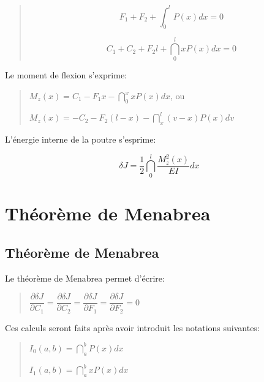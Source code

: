 \begin{quotation}
\begin{equation}
   \label{staticF}
   F_1+F_2+\int_0^l P(x)dx=0 
\end{equation}

\begin{equation}
   \label{staticC}
   C_1+C_2+F_2l+\dint_0^l x P(x)dx=0 
\end{equation}
\end{quotation}


\medskip
Le moment de flexion s'exprime:

\begin{quotation}
$M_z(x)=C_1-F_1x-\dint_0^x x P(x)dx$, ou

$M_z(x)=-C_2-F_2(l-x)-\dint_x^l(v-x) P(x)dv$
\end{quotation}

\medskip
L'énergie interne de la poutre s'esprime:

\[
\delta J=\frac 12\dint_0^l\dfrac{M_z^2(x)}{EI}dx
\]

\medskip
\ifVersionAvecExemplesSepares
   \section{Théorème de Menabrea}
\else
   \subsection{Théorème de Menabrea}
\fi

Le théorème de Menabrea permet d'écrire:

\begin{quotation}
   $\dfrac{\partial \delta J}{\partial C_1} =
    \dfrac{\partial \delta J}{\partial C_2} =
    \dfrac{\partial \delta J}{\partial F_1} =
    \dfrac{\partial \delta J}{\partial F_2} = 0$
\end{quotation}

Ces calculs seront faits après avoir introduit les notations suivantes:
\begin{quotation}
   $I_0(a,b)=\dint_a^b P(x)dx$

   $I_1(a,b)=\dint_a^b x P(x)dx$
\end{quotation}



